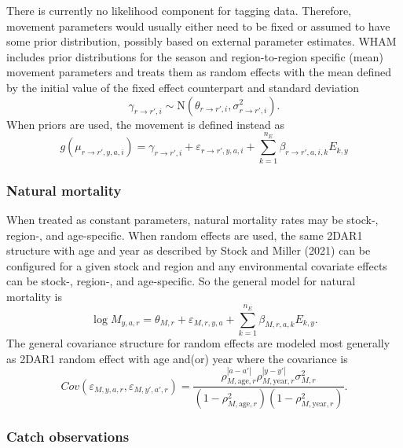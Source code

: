 \documentclass[
]{article}
\begin{document}
There is currently no likelihood component for tagging data. Therefore,
movement parameters would usually either need to be fixed or assumed to
have some prior distribution, possibly based on external parameter
estimates. WHAM includes prior distributions for the season and
region-to-region specific (mean) movement parameters and treats them as
random effects with the mean defined by the initial value of the fixed
effect counterpart and standard deviation \begin{equation*}
  \gamma_{r\rightarrow r',i} \sim \text{N}\left(\theta_{r\rightarrow r',i}, \sigma^2_{r\rightarrow r',i}\right).
  \end{equation*} When priors are used, the movement is defined instead
as \begin{equation*}
  g(\mu_{r\rightarrow r',y,a,i}) = \gamma_{r\rightarrow r',i} + \varepsilon_{r\rightarrow r',y,a,i} + \sum^{n_E}_{k=1} \beta_{r\rightarrow r',a,i,k} E_{k,y} 
  \end{equation*}

\hypertarget{natural-mortality}{%
\subsubsection*{Natural mortality}\label{natural-mortality}}

When treated as constant parameters, natural mortality rates may be
stock-, region-, and age-specific. When random effects are used, the
same 2DAR1 structure with age and year as described by Stock and Miller
(2021) can be configured for a given stock and region and any
environmental covariate effects can be stock-, region-, and
age-specific. So the general model for natural mortality is
\begin{equation*}
  \log M_{y,a,r} = \theta_{M,r} + \varepsilon_{M,r,y,a} + \sum^{n_E}_{k=1} \beta_{M,r,a,k} E_{k,y}.
\end{equation*} The general covariance structure for random effects are
modeled most generally as 2DAR1 random effect with age and(or) year
where the covariance is \begin{equation*}
  Cov\left(\varepsilon_{M,y,a,r},\varepsilon_{M,y',a',r}\right) =   \frac{\rho_{M,\text{age},r}^{|a-a'|}\rho_{M,\text{year},r}^{|y-y'|}\sigma^2_{M,r}}{\left(1 -  \rho_{M,\text{age},r}^2\right)\left(1 - \rho_{M,\text{year},r}^2\right)}.
\end{equation*}

\hypertarget{catch-observations}{%
\subsubsection*{Catch observations}\label{catch-observations}}
\end{document}
